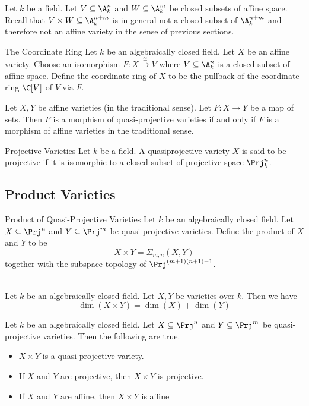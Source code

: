 \documentclass[a4paper]{article}
\begin{document}
Let $k$ be a field. Let $V\subseteq\A_k^n$ and $W\subseteq\A_k^m$ be closed subsets of affine space. Recall that $V\times W\subseteq\A_k^{n+m}$ is in general not a closed subset of $\A_k^{n+m}$ and therefore not an affine variety in the sense of previous sections. 

\begin{defn}{The Coordinate Ring}{} Let $k$ be an algebraically closed field. Let $X$ be an affine variety. Choose an isomorphism $F:X\overset{\cong}{\longrightarrow}V$ where $V\subseteq\A_k^n$ is a closed subset of affine space. Define the coordinate ring of $X$ to be the pullback of the coordinate ring $\C[V]$ of $V$ via $F$. 
\end{defn}

\begin{prp}{}{} Let $X,Y$ be affine varieties (in the traditional sense). Let $F:X\to Y$ be a map of sets. Then $F$ is a morphism of quasi-projective varieties if and only if $F$ is a morphism of affine varieties in the traditional sense. 
\end{prp}

\begin{defn}{Projective Varieties}{} Let $k$ be a field. A quasiprojective variety $X$ is said to be projective if it is isomorphic to a closed subset of projective space $\Prj_k^n$. 
\end{defn}

\subsection{Product Varieties}
\begin{defn}{Product of Quasi-Projective Varieties}{} Let $k$ be an algebraically closed field. Let $X\subseteq\Prj^n$ and $Y\subseteq\Prj^m$ be quasi-projective varieties. Define the product of $X$ and $Y$ to be $$X\times Y=\Sigma_{m,n}(X,Y)$$ together with the subspace topology of $\Prj^{(m+1)(n+1)-1}$. 
\end{defn}

\begin{lmm}{}{}\\
Let $k$ be an algebraically closed field. Let $X,Y$ be varieties over $k$. Then we have $$\dim(X\times Y)=\dim(X)+\dim(Y)$$
\end{lmm}

\begin{lmm}{}{} Let $k$ be an algebraically closed field. Let $X\subseteq\Prj^n$ and $Y\subseteq\Prj^m$ be quasi-projective varieties. Then the following are true. 
\begin{itemize}
\item $X\times Y$ is a quasi-projective variety. 
\item If $X$ and $Y$ are projective, then $X\times Y$ is projective. 
\item If $X$ and $Y$ are affine, then $X\times Y$ is affine
\end{itemize}
\end{lmm}
\end{document}
